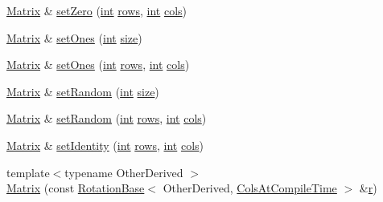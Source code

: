 \begin{DoxyCompactItemize}
\item 
\hyperlink{class_matrix}{Matrix} \& \hyperlink{class_matrix_aefba3e320f654abf72ce52ba46b809aa}{set\-Zero} (\hyperlink{ioapi_8h_a787fa3cf048117ba7123753c1e74fcd6}{int} \hyperlink{class_matrix_a5c0643ac5b12c576300a3c60899a61c9}{rows}, \hyperlink{ioapi_8h_a787fa3cf048117ba7123753c1e74fcd6}{int} \hyperlink{class_matrix_a6457e87782c95b003d23f8b8b90e6838}{cols})
\item 
\hyperlink{class_matrix}{Matrix} \& \hyperlink{class_matrix_aaca60bac3d71b721a97bbd16589c2c9c}{set\-Ones} (\hyperlink{ioapi_8h_a787fa3cf048117ba7123753c1e74fcd6}{int} \hyperlink{glext_8h_a014d89bd76f74ef3a29c8f04b473eb76}{size})
\item 
\hyperlink{class_matrix}{Matrix} \& \hyperlink{class_matrix_a867ff1dda53fb6bf3df482223343d25d}{set\-Ones} (\hyperlink{ioapi_8h_a787fa3cf048117ba7123753c1e74fcd6}{int} \hyperlink{class_matrix_a5c0643ac5b12c576300a3c60899a61c9}{rows}, \hyperlink{ioapi_8h_a787fa3cf048117ba7123753c1e74fcd6}{int} \hyperlink{class_matrix_a6457e87782c95b003d23f8b8b90e6838}{cols})
\item 
\hyperlink{class_matrix}{Matrix} \& \hyperlink{class_matrix_afd468de0eeabeb6797cad64bc34506c8}{set\-Random} (\hyperlink{ioapi_8h_a787fa3cf048117ba7123753c1e74fcd6}{int} \hyperlink{glext_8h_a014d89bd76f74ef3a29c8f04b473eb76}{size})
\item 
\hyperlink{class_matrix}{Matrix} \& \hyperlink{class_matrix_aae0b1090599968070a8168719e52cd23}{set\-Random} (\hyperlink{ioapi_8h_a787fa3cf048117ba7123753c1e74fcd6}{int} \hyperlink{class_matrix_a5c0643ac5b12c576300a3c60899a61c9}{rows}, \hyperlink{ioapi_8h_a787fa3cf048117ba7123753c1e74fcd6}{int} \hyperlink{class_matrix_a6457e87782c95b003d23f8b8b90e6838}{cols})
\item 
\hyperlink{class_matrix}{Matrix} \& \hyperlink{class_matrix_a5afcfab2eefb3c715272fcc19cb63d5d}{set\-Identity} (\hyperlink{ioapi_8h_a787fa3cf048117ba7123753c1e74fcd6}{int} \hyperlink{class_matrix_a5c0643ac5b12c576300a3c60899a61c9}{rows}, \hyperlink{ioapi_8h_a787fa3cf048117ba7123753c1e74fcd6}{int} \hyperlink{class_matrix_a6457e87782c95b003d23f8b8b90e6838}{cols})
\item 
{\footnotesize template$<$typename Other\-Derived $>$ }\\\hyperlink{class_matrix_aa0627810816e2ef1413549aef6f6e55b}{Matrix} (const \hyperlink{class_rotation_base}{Rotation\-Base}$<$ Other\-Derived, \hyperlink{class_matrix_base_aaa53a8ec1bc1ba52b1e50631dac15d6da359babfd1277ae780433d99b383e00e8}{Cols\-At\-Compile\-Time} $>$ \&\hyperlink{glext_8h_abe08814c2f72843fde4d8df41440d5a0}{r})

\end{DoxyCompactItemize}
